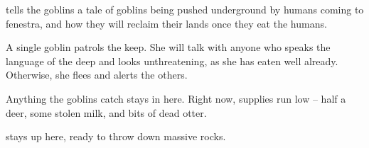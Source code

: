 \begin{multicols}{2}



 tells the goblins a tale of goblins being pushed underground by humans coming to \gls{fenestra}, and how they will reclaim their lands once they eat the humans.


\goblin


A single goblin patrols the keep.
She will talk with anyone who speaks the language of the \gls{deep} and looks unthreatening, as she has eaten well already.
Otherwise, she flees and alerts the others.



Anything the goblins catch stays in here.
Right now, supplies run low -- half a deer, some stolen milk, and bits of dead otter.


 stays up here, ready to throw down massive rocks.

 \end{multicols}


